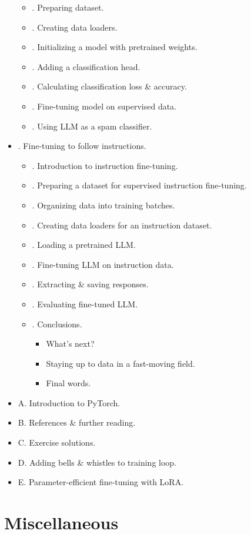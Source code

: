 \documentclass{article}
\begin{document}
\begin{itemize}
\begin{itemize}
		\item {. Preparing dataset.}
		\item {. Creating data loaders.}
		\item {. Initializing a model with pretrained weights.}
		\item {. Adding a classification head.}
		\item {. Calculating classification loss \& accuracy.}
		\item {. Fine-tuning model on supervised data.}
		\item {. Using LLM as a spam classifier.}
	\end{itemize}
	\item {. Fine-tuning to follow instructions.}
	\begin{itemize}
		\item {. Introduction to instruction fine-tuning.}
		\item {. Preparing a dataset for supervised instruction fine-tuning.}
		\item {. Organizing data into training batches.}
		\item {. Creating data loaders for an instruction dataset.}
		\item {. Loading a pretrained LLM.}
		\item {. Fine-tuning LLM on instruction data.}
		\item {. Extracting \& saving responses.}
		\item {. Evaluating fine-tuned LLM.}
		\item {. Conclusions.}
		\begin{itemize}
			\item {\sf What's next?}
			\item {\sf Staying up to data in a fast-moving field.}
			\item {\sf Final words.}
		\end{itemize}
	\end{itemize}
	\item {\sf A. Introduction to PyTorch.}
	\item {\sf B. References \& further reading.}
	\item {\sf C. Exercise solutions.}
	\item {\sf D. Adding bells \& whistles to training loop.}
	\item {\sf E. Parameter-efficient fine-tuning with LoRA.}
\end{itemize}


\section{Miscellaneous}


\printbibliography[heading=bibintoc]
	
\end{document}
